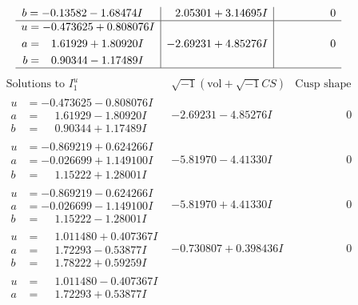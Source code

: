\documentclass[1p]{elsarticle_modified}
\theoremstyle{definition}
\newcommand{\I}{\sqrt{-1}}
\begin{document}
$$\begin{array}{c|c|c}
\begin{aligned}
b &= -0.13582 - 1.68474 I\end{aligned}
 & \phantom{-}2.05301 + 3.14695 I & \phantom{-0.000000 } 0 \\ \hline\begin{aligned}
u &= -0.473625 + 0.808076 I \\
a &= \phantom{-}1.61929 + 1.80920 I \\
b &= \phantom{-}0.90344 - 1.17489 I\end{aligned}
 & -2.69231 + 4.85276 I & \phantom{-0.000000 } 0\\
 \hline 
 \end{array}$$\newpage$$\begin{array}{c|c|c}  
\text{Solutions to }I^u_{1}& \I (\text{vol} + \sqrt{-1}CS) & \text{Cusp shape}\\
 \hline 
\begin{aligned}
u &= -0.473625 - 0.808076 I \\
a &= \phantom{-}1.61929 - 1.80920 I \\
b &= \phantom{-}0.90344 + 1.17489 I\end{aligned}
 & -2.69231 - 4.85276 I & \phantom{-0.000000 } 0 \\ \hline\begin{aligned}
u &= -0.869219 + 0.624266 I \\
a &= -0.026699 + 1.149100 I \\
b &= \phantom{-}1.15222 + 1.28001 I\end{aligned}
 & -5.81970 - 4.41330 I & \phantom{-0.000000 } 0 \\ \hline\begin{aligned}
u &= -0.869219 - 0.624266 I \\
a &= -0.026699 - 1.149100 I \\
b &= \phantom{-}1.15222 - 1.28001 I\end{aligned}
 & -5.81970 + 4.41330 I & \phantom{-0.000000 } 0 \\ \hline\begin{aligned}
u &= \phantom{-}1.011480 + 0.407367 I \\
a &= \phantom{-}1.72293 - 0.53877 I \\
b &= \phantom{-}1.78222 + 0.59259 I\end{aligned}
 & -0.730807 + 0.398436 I & \phantom{-0.000000 } 0 \\ \hline\begin{aligned}
u &= \phantom{-}1.011480 - 0.407367 I \\
a &= \phantom{-}1.72293 + 0.53877 I \\

\end{aligned}
\end{array}$$
\end{document}
